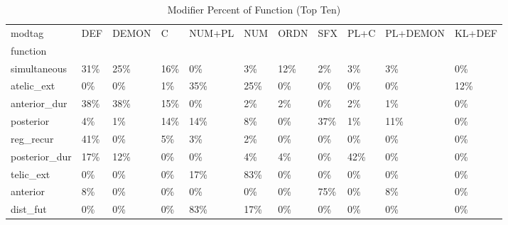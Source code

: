 \begin{table}[htbp!]
\centering
\caption{Modifier Percent of Function (Top Ten)}
\label{table:afmod_pc}
\begin{adjustbox}{width=1\textwidth}
\begin{tabular}{lllllllllll}
\toprule
modtag &  DEF & DEMON &    C & NUM+PL &  NUM & ORDN &  SFX & PL+C & PL+DEMON & KL+DEF \\
function      &      &       &      &        &      &      &      &      &          &        \\
\midrule
simultaneous  &  31\% &   25\% &  16\% &     0\% &   3\% &  12\% &   2\% &   3\% &       3\% &     0\% \\
atelic\_ext    &   0\% &    0\% &   1\% &    35\% &  25\% &   0\% &   0\% &   0\% &       0\% &    12\% \\
anterior\_dur  &  38\% &   38\% &  15\% &     0\% &   2\% &   2\% &   0\% &   2\% &       1\% &     0\% \\
posterior     &   4\% &    1\% &  14\% &    14\% &   8\% &   0\% &  37\% &   1\% &      11\% &     0\% \\
reg\_recur     &  41\% &    0\% &   5\% &     3\% &   2\% &   0\% &   0\% &   0\% &       0\% &     0\% \\
posterior\_dur &  17\% &   12\% &   0\% &     0\% &   4\% &   4\% &   0\% &  42\% &       0\% &     0\% \\
telic\_ext     &   0\% &    0\% &   0\% &    17\% &  83\% &   0\% &   0\% &   0\% &       0\% &     0\% \\
anterior      &   8\% &    0\% &   0\% &     0\% &   0\% &   0\% &  75\% &   0\% &       8\% &     0\% \\
dist\_fut      &   0\% &    0\% &   0\% &    83\% &  17\% &   0\% &   0\% &   0\% &       0\% &     0\% \\
\bottomrule
\end{tabular}
\end{adjustbox}
\end{table}
